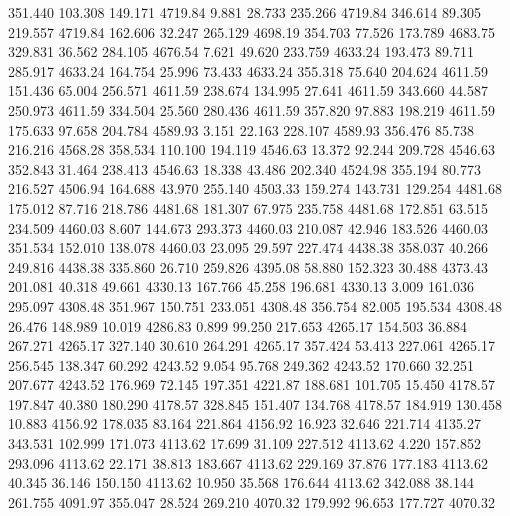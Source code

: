  351.440  103.308  149.171      4719.84
   9.881   28.733  235.266      4719.84
 346.614   89.305  219.557      4719.84
 162.606   32.247  265.129      4698.19
 354.703   77.526  173.789      4683.75
 329.831   36.562  284.105      4676.54
   7.621   49.620  233.759      4633.24
 193.473   89.711  285.917      4633.24
 164.754   25.996   73.433      4633.24
 355.318   75.640  204.624      4611.59
 151.436   65.004  256.571      4611.59
 238.674  134.995   27.641      4611.59
 343.660   44.587  250.973      4611.59
 334.504   25.560  280.436      4611.59
 357.820   97.883  198.219      4611.59
 175.633   97.658  204.784      4589.93
   3.151   22.163  228.107      4589.93
 356.476   85.738  216.216      4568.28
 358.534  110.100  194.119      4546.63
  13.372   92.244  209.728      4546.63
 352.843   31.464  238.413      4546.63
  18.338   43.486  202.340      4524.98
 355.194   80.773  216.527      4506.94
 164.688   43.970  255.140      4503.33
 159.274  143.731  129.254      4481.68
 175.012   87.716  218.786      4481.68
 181.307   67.975  235.758      4481.68
 172.851   63.515  234.509      4460.03
   8.607  144.673  293.373      4460.03
 210.087   42.946  183.526      4460.03
 351.534  152.010  138.078      4460.03
  23.095   29.597  227.474      4438.38
 358.037   40.266  249.816      4438.38
 335.860   26.710  259.826      4395.08
  58.880  152.323   30.488      4373.43
 201.081   40.318   49.661      4330.13
 167.766   45.258  196.681      4330.13
   3.009  161.036  295.097      4308.48
 351.967  150.751  233.051      4308.48
 356.754   82.005  195.534      4308.48
  26.476  148.989   10.019      4286.83
   0.899   99.250  217.653      4265.17
 154.503   36.884  267.271      4265.17
 327.140   30.610  264.291      4265.17
 357.424   53.413  227.061      4265.17
 256.545  138.347   60.292      4243.52
   9.054   95.768  249.362      4243.52
 170.660   32.251  207.677      4243.52
 176.969   72.145  197.351      4221.87
 188.681  101.705   15.450      4178.57
 197.847   40.380  180.290      4178.57
 328.845  151.407  134.768      4178.57
 184.919  130.458   10.883      4156.92
 178.035   83.164  221.864      4156.92
  16.923   32.646  221.714      4135.27
 343.531  102.999  171.073      4113.62
  17.699   31.109  227.512      4113.62
   4.220  157.852  293.096      4113.62
  22.171   38.813  183.667      4113.62
 229.169   37.876  177.183      4113.62
  40.345   36.146  150.150      4113.62
  10.950   35.568  176.644      4113.62
 342.088   38.144  261.755      4091.97
 355.047   28.524  269.210      4070.32
 179.992   96.653  177.727      4070.32
